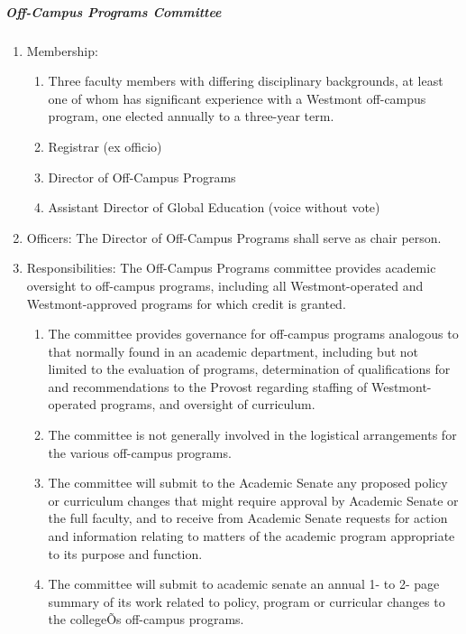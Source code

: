 \documentclass[letterpaper, 11pt]{article}
\begin{document}
				\subparagraph{Off-Campus Programs Committee}
					\begin{enumerate}[label=\alph*)]
						\item{Membership:
							\begin{enumerate}[label=\arabic*)]
								\item{Three faculty members with differing disciplinary backgrounds, at least one of whom has significant experience with a Westmont off-campus program, one elected annually to a three-year term.}
								\item{ Registrar (ex officio)}
								\item{Director of Off-Campus Programs}
								\item{Assistant Director of Global Education (voice without vote)}
							\end{enumerate}
						}
						\item{Officers:
							The Director of Off-Campus Programs shall serve as chair person.
						}
						\item{Responsibilities: The Off-Campus Programs committee provides academic oversight to off-campus programs, including all Westmont-operated and Westmont-approved programs for which credit is granted.
							\begin{enumerate}[label=\arabic*)]
								\item{The committee provides governance for off-campus programs analogous to that normally found in an academic department, including but not limited to the evaluation of programs, determination of qualifications for and recommendations to the Provost regarding staffing of Westmont-operated programs, and oversight of curriculum.}
								\item{The committee is not generally involved in the logistical arrangements for the various off-campus programs.}
								\item{The committee will submit to the Academic Senate any proposed policy or curriculum changes that might require approval by Academic Senate or the full faculty, and to receive from Academic Senate requests for action and information relating to matters of the academic program appropriate to its purpose and function.}
								\item{The committee will submit to academic senate an annual 1- to 2- page summary of its work related to policy, program or curricular changes to the collegeÕs off-campus programs.}
							\end{enumerate}
						}
					\end{enumerate}
\end{document}
